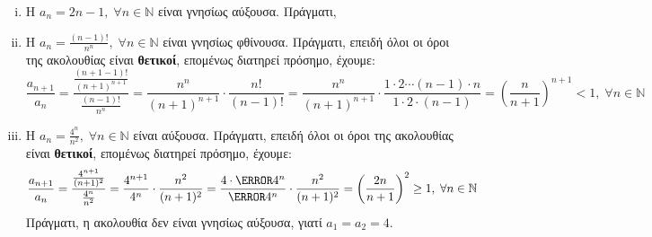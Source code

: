 \begin{examples}
\item {}
  \begin{enumerate}[i)]
    \item Η $ a_{n} = 2n-1, \; \forall n \in \mathbb{N} $ είναι γνησίως 
      αύξουσα. Πράγματι,


    \item Η $ a_{n} = \frac{(n-1)!}{n^{n}}, \; \forall n \in 
      \mathbb{N} $ 
      είναι γνησίως φθίνουσα. Πράγματι, επειδή όλοι οι όροι της ακολουθίας 
      είναι \textbf{θετικοί}, επομένως διατηρεί πρόσημο, έχουμε:
      \[
        \frac{a_{n+1}}{a_n} =
        \frac{\frac{(n+1-1)!}{(n+1)^{n+1}}}{\frac{(n-1)!}{n^{n}}} 
        = \frac{n^{n}}{(n+1)^{n+1}}\cdot \frac{n!}{(n-1)!} 
        = \frac{n^{n}}{(n+1)^{n+1}}\cdot \frac{1\cdot 2\cdots (n-1)\cdot n}{1 \cdot 2
        \cdot (n-1)}  
        = \left(\frac{n}{n+1} \right)^{n+1} < 1, \; \forall n \in \mathbb{N} 
      \] 

    \item Η $ a_{n}= \frac{4^{n}}{n^{2}}, \; \forall n \in \mathbb{N} $ 
      είναι αύξουσα. Πράγματι, επειδή όλοι οι όροι της ακολουθίας 
      είναι \textbf{θετικοί}, επομένως διατηρεί πρόσημο, έχουμε:
      \[
        \frac{a_{n+1}}{a_{n}} 
        = \frac{\frac{4^{n+1}}{(n+1)^{2}}}{\frac{4^{n}}{n^{2}}} 
        = \frac{4^{n+1}}{4^{n}}\cdot \frac{n^{2}}{(n+1)^{2}}  
        = \frac{4\cdot \cancel{4^{n}}}{\cancel{4^{n}}} \cdot \frac{n^{2}}{(n+1)^{2}}
        = \left( \frac{2n}{n+1} \right)^{2} \geq 1, 
        \; \forall n \in \mathbb{N} 
      \]
      Πράγματι, η ακολουθία δεν είναι γνησίως αύξουσα, γιατί $ a_{1}= a_{2}=4$.


\end{enumerate}
\end{examples}
